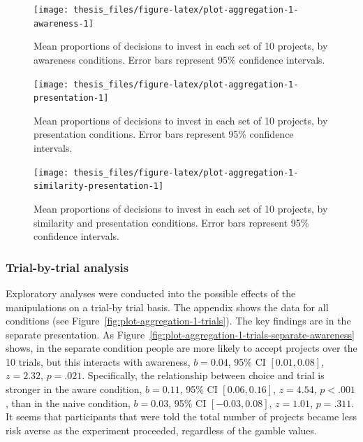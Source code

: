 \documentclass[a4paper, nobind, dvipsnames]{templates/ociamthesis}
\theoremstyle{definition}
\theoremstyle{definition}
\theoremstyle{definition}
\theoremstyle{definition}
\theoremstyle{remark}
\begin{document}
\begin{figure}
\texttt{[image: thesis\_files/figure-latex/plot-aggregation-1-awareness-1]} \caption{Mean proportions of decisions to invest in each set of 10 projects, by awareness conditions. Error bars represent 95\% confidence intervals.}\label{fig:plot-aggregation-1-awareness}
\end{figure}



\begin{figure}
\texttt{[image: thesis\_files/figure-latex/plot-aggregation-1-presentation-1]} \caption{Mean proportions of decisions to invest in each set of 10 projects, by presentation conditions. Error bars represent 95\% confidence intervals.}\label{fig:plot-aggregation-1-presentation}
\end{figure}



\begin{figure}
\texttt{[image: thesis\_files/figure-latex/plot-aggregation-1-similarity-presentation-1]} \caption{Mean proportions of decisions to invest in each set of 10 projects, by similarity and presentation conditions. Error bars represent 95\% confidence intervals.}\label{fig:plot-aggregation-1-similarity-presentation}
\end{figure}

\subsubsection{Trial-by-trial analysis}

Exploratory analyses were conducted into the possible effects of the
manipulations on a trial-by trial basis. The appendix shows the data for all
conditions (see Figure~\ref{fig:plot-aggregation-1-trials}). The key findings
are in the separate presentation. As
Figure~\ref{fig:plot-aggregation-1-trials-separate-awareness} shows, in the
separate condition people are more likely to accept projects over the 10 trials,
but this interacts with awareness,
\(b = 0.04\), 95\% CI \([0.01, 0.08]\), \(z = 2.32\), \(p = .021\).
Specifically, the relationship between choice and trial is stronger in the aware
condition,
\(b = 0.11\), 95\% CI \([0.06, 0.16]\), \(z = 4.54\), \(p < .001\), than in the
naive condition,
\(b = 0.03\), 95\% CI \([-0.03, 0.08]\), \(z = 1.01\), \(p = .311\). It seems that
participants that were told the total number of projects became less risk averse
as the experiment proceeded, regardless of the gamble values.
\end{document}
